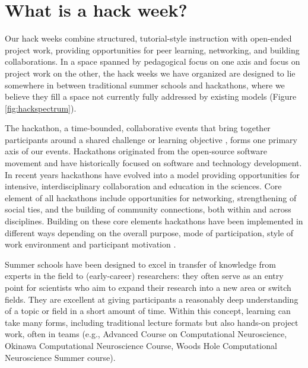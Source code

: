 \section*{What is a hack week?}

Our hack weeks combine structured, tutorial-style instruction with open-ended project work, providing opportunities for peer learning, networking, and building collaborations.  
In a space spanned by pedagogical focus on one axis and focus on project work on the other, the hack weeks we have organized are designed to lie somewhere in between traditional summer schools and hackathons, where we believe they fill a space not currently fully addressed by existing models (Figure \ref{fig:hackspectrum}).

The hackathon, a time-bounded, collaborative events that bring together participants around a shared challenge or learning objective \cite{Decker2015}, forms one primary axis of our events. 
Hackathons originated from the open-source software movement and have historically focused on software and technology development. 
In recent years hackathons have evolved into a model providing opportunities for intensive, interdisciplinary collaboration \cite{Groen2015-cj} and education \cite{Kienzler2015-zu,Lamers2014-xf} in the sciences. 
Core element of all hackathons include opportunities for networking, strengthening of social ties, and the building of community connections, both within and across disciplines.
Building on these core elements hackathons have been implemented in different ways depending on the overall purpose, mode of participation, style of work environment and participant motivation \cite{Drouhard2017}. 

Summer schools have been designed to excel in transfer of knowledge from experts in the field to (early-career) researchers: they often serve as an entry point for scientists who aim to expand their research into a new area or switch fields. They are excellent at giving participants a reasonably deep understanding of a topic or field in a short amount of time. Within this concept, learning can take many forms, including traditional lecture formats but also hands-on project work, often in teams (e.g., Advanced Course on Computational Neuroscience, Okinawa Computational Neuroscience Course, Woods Hole Computational Neuroscience Summer course). 

